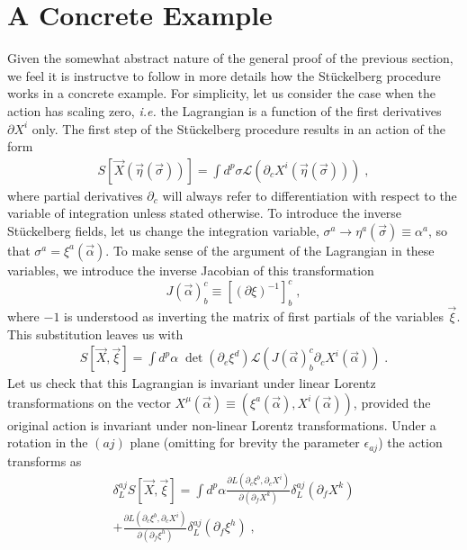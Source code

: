\documentclass[%
 reprint,
 amsmath,amssymb,
 aps,
]{revtex4-1}
\begin{document}
\section{A Concrete Example}
Given the somewhat abstract nature of the general proof of the previous section, we feel it is instructve to follow in more details
 how the St\"uckelberg procedure works in a concrete example. For simplicity, let us consider the case when the action has scaling zero,
 {\it i.e.} the Lagrangian is a function of the first derivatives $\partial X^i$ only. The first step of the St\"uckelberg procedure results in an action of the form
\begin{eqnarray}
    S[\vec{X}(\vec{\eta}(\vec{\sigma}))] = \int d^p \sigma \mathcal{L}
     (\partial_c X^i (\vec{\eta}(\vec{\sigma}))) \; , \nonumber
\end{eqnarray}
where partial derivatives $\partial_c$ will always refer to differentiation with respect to the variable of integration
unless stated otherwise.  To introduce the inverse St\"uckelberg fields, let us change the integration variable,
 $\sigma^a \rightarrow \eta^a(\vec{\sigma}) \equiv \alpha^a$, so that
$\sigma^a = \xi^a(\vec{\alpha})$. To make sense of the argument of the Lagrangian in these variables, we introduce the inverse
Jacobian of this transformation
\begin{equation}
    J(\vec{\alpha})^c_b \equiv [(\partial \xi)^{-1}]^c_b \; ,
\end{equation}
where $-1$ is understood as inverting the matrix of first partials of the variables $\vec{\xi}$.
This substitution leaves us with
\begin{eqnarray}
    S[\vec{X},\vec{\xi}]  = \int d^p \alpha\;
   \mathrm{\det}\left({\partial_e \xi^d} \right)
   \mathcal{L}( J(\vec{\alpha})^c_b \partial_c X^i(\vec{\alpha}) )
     \; . \nonumber
\end{eqnarray}
Let us check that this Lagrangian is invariant under linear Lorentz
transformations on the vector $X^{\mu}(\vec{\alpha}) \equiv (\xi^a(\vec{\alpha}), X^i(\vec{\alpha}))$,
provided the original  action is invariant under non-linear Lorentz transformations. Under  a rotation
in the $(aj)$ plane (omitting for brevity the parameter $\epsilon_{a j}$) the action transforms as
\begin{gather}
\label{Lvariation}
\delta^{a j}_{L}S[\vec{X},\vec{\xi}] =
    \int d^p \alpha \frac{\partial L(\partial_c \xi^b, \partial_c X^i)}{\partial(\partial_f X^k)}
    \delta^{a j}_{L} (\partial_f X^k)  \\
    + \frac{\partial L(\partial_c \xi^b, \partial_c X^i)}{\partial(\partial_f \xi^h)}
    \delta^{a j}_{L} (\partial_f \xi^h) \nonumber\;,
\end{gather}
\end{document}
